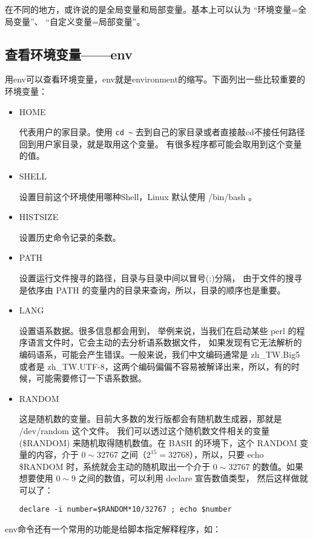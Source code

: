 在不同的地方，或许说的是全局变量和局部变量。基本上可以认为 “环境变量=全局变量”、 “自定义变量=局部变量”。





\subsection{查看环境变量——env}
用env可以查看环境变量，env就是environment的缩写。下面列出一些比较重要的环境变量：
\begin{itemize}
\item HOME

代表用户的家目录。使用 \verb|cd ~| 去到自己的家目录或者直接敲cd不接任何路径回到用户家目录，就是取用这个变量。 有很多程序都可能会取用到这个变量的值。

\item SHELL

设置目前这个环境使用哪种Shell，Linux 默认使用 /bin/bash 。

\item HISTSIZE

设置历史命令记录的条数。

\item PATH

设置运行文件搜寻的路径，目录与目录中间以冒号(:)分隔， 由于文件的搜寻是依序由 PATH 的变量内的目录来查询，所以，目录的顺序也是重要。

\item LANG

设置语系数据。很多信息都会用到， 举例来说，当我们在启动某些 perl 的程序语言文件时，它会主动的去分析语系数据文件， 如果发现有它无法解析的编码语系，可能会产生错误。一般来说，我们中文编码通常是 zh\_TW.Big5 或者是 zh\_TW.UTF-8，这两个编码偏偏不容易被解译出来，所以，有的时候，可能需要修订一下语系数据。 

\item RANDOM

这是随机数的变量。目前大多数的发行版都会有随机数生成器，那就是 /dev/random 这个文件。 我们可以透过这个随机数文件相关的变量 (\$RANDOM) 来随机取得随机数值。在 BASH 的环境下，这个 RANDOM 变量的内容，介于 $0\sim32767$ 之间（$2^{15}=32768$），所以，只要 echo \$RANDOM 时，系统就会主动的随机取出一个介于 $0\sim32767$ 的数值。如果想要使用 $0\sim9$ 之间的数值，可以利用 declare 宣告数值类型， 然后这样做就可以了：

\verb|declare -i number=$RANDOM*10/32767 ; echo $number|
\end{itemize}

env命令还有一个常用的功能是给脚本指定解释程序，如：

